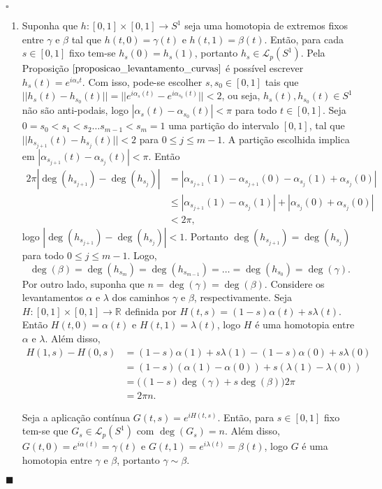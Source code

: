 \documentclass[12pt]{book}
\newenvironment{prova}[1]{$\square$ #1}{\hfill$\blacksquare$}
\newcommand{\caminhos}{\mathcal{L}}
\newcommand{\caminhospontobasegeral}[2]{\caminhos_{#1}(#2)}
\newcommand{\circulo}{S^{1}}
\newcommand{\norma}[1]{||#1||}
\newcommand{\real}[1]{\mathbb{R}^{#1}}
\begin{document}
\begin{prova}
\begin{enumerate}
			\item Suponha que $h:[0,1]\times [0,1]\to S^{1}$ seja uma homotopia de extremos fixos entre $\gamma$ e $\beta$ tal que $h(t,0) = \gamma(t)$ e $h(t,1) = \beta(t)$. Então, para cada $s \in [0,1]$ fixo tem-se $h_{s}(0) = h_{s}(1)$, portanto $h_{s} \in \caminhospontobasegeral{p}{\circulo}$. Pela Proposição $\ref{proposicao_levantamento_curvas}$ é possível escrever $h_{s}(t) = e^{i\alpha_{s}t}$. Com isso, pode-se escolher $s, s_{0 }\in [0,1]$ tais que $\norma{h_{s}(t)-h_{s_{0}}(t)} =\norma{e^{i\alpha_{s}(t)} - e^{i\alpha_{s_{0}}(t)}} <2$, ou seja, $h_{s}(t), h_{s_{0}}(t) \in \circulo$ não são anti-podais, logo $|\alpha_{s}(t)-\alpha_{s_{0}}(t)| <\pi$ para todo $t\in [0,1]$. Seja $0=s_{0}<s_{1}<s_{2}\dots s_{m-1}<s_{m} = 1$ uma partição do intervalo $[0,1]$, tal que $\norma{h_{s_{j+1}}(t)-h_{s_{j}}(t)}<2$ para $0\leq j \leq m-1$. A partição escolhida implica em $|\alpha_{s_{j+1}}(t)-\alpha_{s_{j}}(t)| <\pi$. Então
			$$
			\begin{aligned}
			2\pi|\deg(h_{s_{j+1}})-\deg(h_{s_{j}})| 
			&= |\alpha_{s_{j+1}}(1)-\alpha_{s_{j+1}}(0) - \alpha_{s_{j}}(1)+\alpha_{s_{j}}(0)|
			\\
			&\leq |\alpha_{s_{j+1}}(1)-\alpha_{s_{j}}(1)| + |\alpha_{s_{j}}(0)+\alpha_{s_{j}}(0)|
			\\
			&<2\pi,
			\end{aligned} 
			$$
			logo $|\deg(h_{s_{j+1}})-\deg(h_{s_{j}})| <1$. Portanto $\deg(h_{s_{j+1}})=\deg(h_{s_{j}})$ para todo $0\leq j \leq m-1$. Logo, 
			$$
			\deg(\beta) = \deg(h_{s_{m}})=\deg(h_{s_{m-1}})=\dots=\deg(h_{s_{0}}) = \deg(\gamma).
			$$
			Por outro lado, suponha que $n = \deg(\gamma)=\deg(\beta)$. Considere os levantamentos $\alpha$ e $\lambda$ dos caminhos $\gamma$ e $\beta$, respectivamente. Seja $H:[0,1]\times [0,1] \to \real{}$ definida por $H(t,s) = (1-s)\alpha(t) + s\lambda(t)$. Então $H(t,0)=\alpha(t)$ e $H(t,1)=\lambda(t)$, logo $H$ é uma homotopia entre $\alpha$ e $\lambda$. Além disso, 
			$$
			\begin{aligned}
			H(1,s) - H(0,s) 
			&= (1-s)\alpha(1) + s\lambda(1) - (1-s)\alpha(0) + s\lambda(0) 
			\\
			&= (1-s)(\alpha(1)-\alpha(0)) + s(\lambda(1)-\lambda(0))
			\\
			&=\big( (1-s)\deg(\gamma) +s\deg(\beta)\big)2\pi
			\\
			&= 2\pi n.
			\end{aligned}
			$$ 
			
			Seja a aplicação contínua $G(t, s) = e^{iH(t,s)}$. Então, para $s \in [0,1]$ fixo tem-se que $G_{s} \in \caminhospontobasegeral{p}{\circulo}$ com $\deg(G_{s}) = n$. Além disso, $G(t,0) = e^{i\alpha(t)} = \gamma(t)$ e $G(t,1) = e^{i\lambda(t)} = \beta(t)$, logo $G$ é uma homotopia entre $\gamma$ e $\beta$, portanto $\gamma \sim \beta$.
			

\end{enumerate}
\end{prova}
\end{document}
